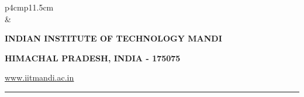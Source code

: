 \documentclass[12 pt, a4paper]{article}
\newcommand{\HRule}{\rule{\linewidth}{1mm}}
\begin{document}
\pagestyle{empty}
\vskip 0.2cm
	\begin{tabular}{p{4cm}p{11.5cm}}
		  \\
		& \centering \large\bf\phantom{Empty line}\\ 
		\rule{0pt}{1pt} \centering \large\bf{INDIAN INSTITUTE OF TECHNOLOGY MANDI} \\
		\rule{0pt}{1pt} \centering \large\bf{HIMACHAL PRADESH, INDIA - 175075} \\
		\rule{0pt}{1pt} \centering \underline{\href{www.iitmandi.ac.in}{www.iitmandi.ac.in}}\\
	\end{tabular}
\noindent

{\raggedleft{}\HRule}




     
\clearpage




\end{document}
